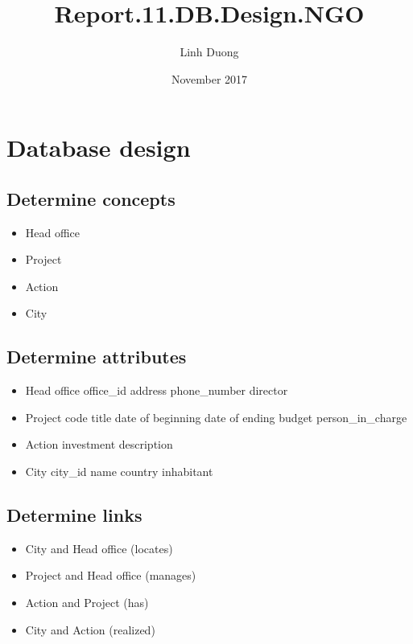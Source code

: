 \documentclass{article}
\title{Report.11.DB.Design.NGO}
\author{Linh Duong}
\date{November 2017}
\begin{document}
\maketitle

\section{Database design}
\subsection{Determine concepts}
\begin{itemize}
    \item Head office
    \item Project
    \item Action 
    \item City
\end{itemize}

\subsection{Determine attributes}
\begin{itemize}
    \item Head office 
    \subitem office\_id
    \subitem address
    \subitem phone\_number
    \subitem director
    
    \item Project
    \subitem code
    \subitem title 
    \subitem date of beginning
    \subitem date of ending 
    \subitem budget
    \subitem person\_in\_charge 
    
    \item Action 
    \subitem investment
    \subitem description 
    
    \item City
    \subitem city\_id
    \subitem name
    \subitem country 
    \subitem inhabitant 
\end{itemize}

\subsection{Determine links}
\begin{itemize}
    \item City and Head office (locates)
    \item Project and Head office (manages)
    \item Action and Project (has)
    \item City and Action (realized)
\end{itemize}
\end{document}
